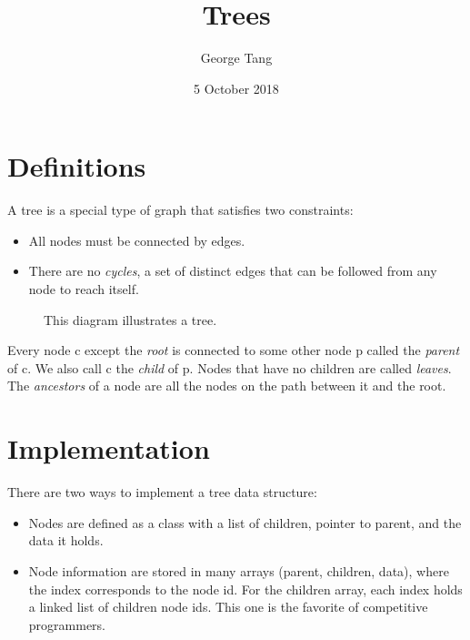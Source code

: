 \documentclass{article}
\title{Trees}
\author{George Tang}
\date{5 October 2018}
\begin{document}
\maketitle

\section{Definitions}
A tree is a special type of graph that satisfies two constraints:
\begin{itemize}
    \item All nodes must be connected by edges.
    \item There are no \textit{cycles}, a set of distinct edges that can be followed from any node to reach itself.
\end{itemize}

\begin{figure}[h]
\centering
{}
\caption{This diagram illustrates a tree.}
\end{figure}

Every node c except the \textit{root} is connected to some other node p called the \textit{parent} of c. We also call c the \textit{child} of p. Nodes that have no children are called \textit{leaves}. The \textit{ancestors} of a node are all the nodes on the path between it and the root.  

\section{Implementation}
There are two ways to implement a tree data structure:
\begin{itemize}
    \item Nodes are defined as a class with a list of children, pointer to parent, and the data it holds.
    \item Node information are stored in many arrays (parent, children, data), where the index corresponds to the node id. For the children array, each index holds a linked list of children node ids. This one is the favorite of competitive programmers.
\end{itemize}
\end{document}
